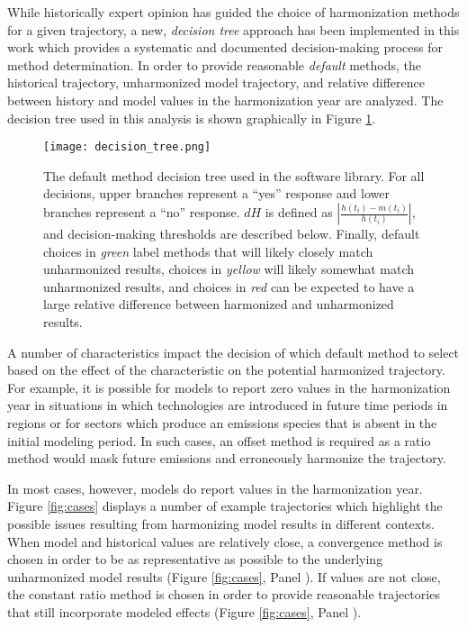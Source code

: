 While historically expert opinion has guided the choice of harmonization methods
for a given trajectory, a new, \textit{decision tree} approach has been
implemented in this work which provides a systematic and documented
decision-making process for method determination. In order to provide reasonable
\textit{default} methods, the historical trajectory, unharmonized model
trajectory, and relative difference between history and model values in the
harmonization year are analyzed. The decision tree used in this analysis is
shown graphically in Figure \ref{fig:decision_tree}.


\begin{figure}
  \begin{center}
    \texttt{[image: decision\_tree.png]}
    \caption[]{
      \label{fig:decision_tree}
      The default method decision tree used in the  software
      library. For all decisions, upper branches represent a ``yes'' response
      and lower branches represent a ``no'' response. $dH$ is defined as
      $\left|\frac{h(t_i) - m(t_i)}{h(t_i)}\right|$, and decision-making
      thresholds are described below. Finally, default choices in \textit{green}
      label methods that will likely closely match unharmonized results, choices
      in \textit{yellow} will likely somewhat match unharmonized results, and
      choices in \textit{red} can be expected to have a large relative
      difference between harmonized and unharmonized results.}
  \end{center}
\end{figure}

A number of characteristics impact the decision of which default method to
select based on the effect of the characteristic on the potential harmonized
trajectory. For example, it is possible for models to report zero values in the
harmonization year in situations in which technologies are introduced in future
time periods in regions or for sectors which produce an emissions species that
is absent in the initial modeling period. In such cases, an offset method is
required as a ratio method would mask future emissions and erroneously harmonize
the trajectory. 

In most cases, however, models do report values in the harmonization
year. Figure \ref{fig:cases} displays a number of example trajectories which
highlight the possible issues resulting from harmonizing model results in
different contexts. When model and historical values are relatively close, a
convergence method is chosen in order to be as representative as possible to the
underlying unharmonized model results (Figure \ref{fig:cases}, Panel
). If values are not close, the constant ratio method is chosen in order
to provide reasonable trajectories that still incorporate modeled effects
(Figure \ref{fig:cases}, Panel ). 

